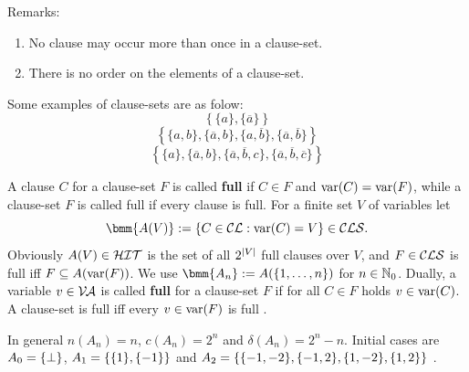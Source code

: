 \documentclass[]{book}
\begin{document}
Remarks:
\begin{enumerate}
      \item No clause may occur more than once in a clause-set.
      \item There is no order on the elements of a clause-set.
\end{enumerate}
\begin{examp}\label{exp:cls}
      Some examples of clause-sets are as folow:
      $$\left\{\{a\}, \{\overline{a}\}\right\}$$
      $$\left\{\{a,b\}, \{\overline{a},b\}, \{a, \overline{b}\}, \{\overline{a},\overline{b}\}\right\}$$
      $$\left\{\{a\}, \{\overline{a},b\}, \{\overline{a}, \overline{b}, c\}, \{\overline{a}, \overline{b}, \overline{c}\}\right\}$$
\end{examp}
\begin{defi}\label{def:fullcls}
      A clause $C$  for a clause-set $F$ is called \textbf{full} if $C \in F$ and $\operatorname{var}(C) = \operatorname{var}(F)$, while a clause-set 
	  $F$ is called full if every clause is full. For a finite set $V$ of variables let
      \begin{displaymath}
      \bmm{A(V)} := \set{C \in \Cl : \var(C) = V} \in \Cls.
      \end{displaymath}
      Obviously $A(V) \in \mathcal{HIT}$ is the set of all $2^{\lvert V \rvert}$ full clauses over $V$, and $F \in \mathcal{CLS}$ is full iff 
	  $F \subseteq A(\operatorname{var}(F))$. We use $\bmm{A_n} := A(\tb 1n)$ for $n \in \mathbb{N}_0$. Dually, a variable $v \in \mathcal{V\hspace{-0.1em}A}$ is called 
	  \textbf{full} for a clause-set $F$ if for all $C \in F$ holds $v \in \operatorname{var}(C)$. A clause-set is full iff every 
	  $v \in \operatorname{var}(F)$ is full \cite{h9}.
\end{defi}

\begin{examp}\label{exp:An}
  In general $n(A_n) = n$, $c(A_n) = 2^n$ and $\delta(A_n) = 2^n-n$. Initial cases are $A_0 = \{ \bot \}$, $A_1 = \{ \{ 1 \},\{ -1 \} \}$ 
  and $A_2 = \{ \{ -1,-2 \},\{ -1,2 \},\{ 1,-2 \},\{ 1,2 \} \}$ \cite{h12}.
\end{examp}
\end{document}
